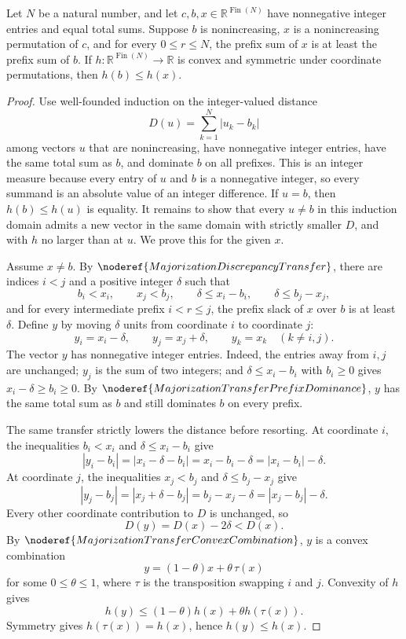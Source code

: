 \begin{helper}
Let \(N\) be a natural number, and let \(c, b, x \in \mathbb R^{\operatorname{Fin}(N)}\) have nonnegative integer entries and equal total sums. Suppose \(b\) is nonincreasing, \(x\) is a nonincreasing permutation of \(c\), and for every \(0 \le r \le N\), the prefix sum of \(x\) is at least the prefix sum of \(b\). If \(h \colon \mathbb R^{\operatorname{Fin}(N)} \to \mathbb R\) is convex and symmetric under coordinate permutations, then \(h(b) \le h(x)\).
\end{helper}
\begin{proof}
Use well-founded induction on the integer-valued distance
\[
D(u)=\sum_{k=1}^N |u_k-b_k|
\]
among vectors \(u\) that are nonincreasing, have nonnegative integer entries,
have the same total sum as \(b\), and dominate \(b\) on all prefixes.  This
is an integer measure because every entry of \(u\) and \(b\) is a
nonnegative integer, so every summand is an absolute value of an integer
difference.  If \(u=b\), then \(h(b)\le h(u)\) is equality.  It remains to
show that every \(u\ne b\) in this induction domain admits a new vector in
the same domain with strictly smaller \(D\), and with \(h\) no larger than
at \(u\).  We prove this for the given \(x\).

Assume \(x\ne b\).  By \(\noderef{MajorizationDiscrepancyTransfer}\), there
are indices \(i<j\) and a positive integer \(\delta\) such that
\[
b_i<x_i,\qquad x_j<b_j,\qquad
\delta\le x_i-b_i,\qquad \delta\le b_j-x_j,
\]
and for every intermediate prefix \(i<r\le j\), the prefix slack of \(x\)
over \(b\) is at least \(\delta\).  Define \(y\) by moving \(\delta\) units
from coordinate \(i\) to coordinate \(j\):
\[
y_i=x_i-\delta,\qquad y_j=x_j+\delta,\qquad y_k=x_k\quad(k\ne i,j).
\]
The vector \(y\) has nonnegative integer entries.  Indeed, the entries away
from \(i,j\) are unchanged; \(y_j\) is the sum of two integers; and
\(\delta\le x_i-b_i\) with \(b_i\ge0\) gives \(x_i-\delta\ge b_i\ge0\).
By \(\noderef{MajorizationTransferPrefixDominance}\), \(y\) has the same
total sum as \(b\) and still dominates \(b\) on every prefix.

The same transfer strictly lowers the distance before resorting.  At
coordinate \(i\), the inequalities \(b_i<x_i\) and
\(\delta\le x_i-b_i\) give
\[
|y_i-b_i|=|x_i-\delta-b_i|=x_i-b_i-\delta
       =|x_i-b_i|-\delta.
\]
At coordinate \(j\), the inequalities \(x_j<b_j\) and
\(\delta\le b_j-x_j\) give
\[
|y_j-b_j|=|x_j+\delta-b_j|=b_j-x_j-\delta
       =|x_j-b_j|-\delta.
\]
Every other coordinate contribution to \(D\) is unchanged, so
\[
D(y)=D(x)-2\delta<D(x).
\]
By \(\noderef{MajorizationTransferConvexCombination}\), \(y\) is a convex
combination
\[
y=(1-\theta)x+\theta\,\tau(x)
\]
for some \(0\le\theta\le1\), where \(\tau\) is the transposition swapping
\(i\) and \(j\).  Convexity of \(h\) gives
\[
h(y)\le (1-\theta)h(x)+\theta h(\tau(x)).
\]
Symmetry gives \(h(\tau(x))=h(x)\), hence \(h(y)\le h(x)\).


\end{proof}
